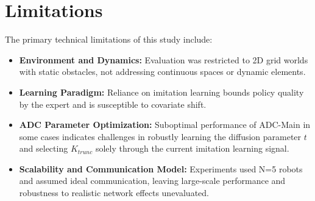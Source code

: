\section{Limitations}
The primary technical limitations of this study include:
\begin{itemize}
    \item \textbf{Environment and Dynamics:} Evaluation was restricted to 2D grid worlds with static obstacles, not addressing continuous spaces or dynamic elements.
    \item \textbf{Learning Paradigm:} Reliance on imitation learning bounds policy quality by the expert and is susceptible to covariate shift.
    \item \textbf{ADC Parameter Optimization:} Suboptimal performance of ADC-Main in some cases indicates challenges in robustly learning the diffusion parameter $t$ and selecting $K_{trunc}$ solely through the current imitation learning signal.
    \item \textbf{Scalability and Communication Model:} Experiments used N=5 robots and assumed ideal communication, leaving large-scale performance and robustness to realistic network effects unevaluated.
\end{itemize}

